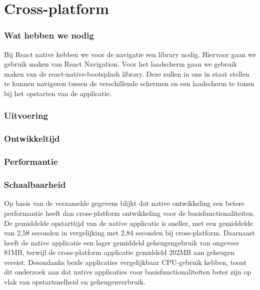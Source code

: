 


\section{Cross-platform}
\subsubsection{Wat hebben we nodig}
Bij React native hebben we voor de navigatie een library nodig. Hiervoor gaan we gebruik maken van
React Navigation. Voor het laadscherm gaan we gebruik maken van de react-native-bootsplash library. 
Deze zullen in ons in staat stellen te kunnen navigeren tussen de verschillende schermen en een
laadscherm te tonen bij het opstarten van de applicatie.

\subsubsection{Uitvoering}



\subsubsection{Ontwikkeltijd}



\subsubsection{Performantie}



\subsubsection{Schaalbaarheid}


Op basis van de verzamelde gegevens blijkt dat native ontwikkeling een betere
performantie heeft dan cross-platform ontwikkeling voor de basisfunctionaliteiten. De gemiddelde 
opstarttijd van de native applicatie is sneller, met een gemiddelde van 2,58 seconden 
in vergelijking met 2,84 seconden bij cross-platform. Daarnaast heeft de native 
applicatie een lager gemiddeld geheugengebruik van ongeveer 81MB, terwijl de cross-platform 
applicatie gemiddeld 202MB aan geheugen vereist. Desondanks beide applicaties
vergelijkbaar CPU-gebruik hebben, toont dit onderzoek aan dat native applicaties voor
basisfunctionaliteiten beter zijn op vlak van opstartsnelheid en geheugenverbruik.

